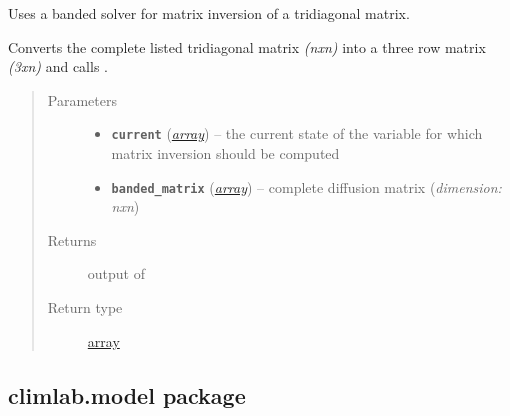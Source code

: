 \documentclass[a4paper,10pt,english]{sphinxmanual}
\begin{document}

\begin{fulllineitems}
\label{api/climlab.dynamics:climlab.dynamics.diffusion._solve_implicit_banded}
Uses a banded solver for matrix inversion of a tridiagonal matrix.

Converts the complete listed tridiagonal matrix \emph{(nxn)} into a three row 
matrix \emph{(3xn)} and calls \href{http://docs.scipy.org/doc/scipy/reference/generated/scipy.linalg.solve\_banded.html\#scipy.linalg.solve\_banded}{}.
\begin{quote}\begin{description}
\item[{Parameters}] \leavevmode\begin{itemize}
\item {} 
\textbf{\texttt{current}} (\href{http://docs.python.org/2.7/library/array.html\#module-array}{\emph{array}}) -- the current state of the variable for which
matrix inversion should be computed

\item {} 
\textbf{\texttt{banded\_matrix}} (\href{http://docs.python.org/2.7/library/array.html\#module-array}{\emph{array}}) -- complete diffusion matrix (\emph{dimension: nxn})

\end{itemize}

\item[{Returns}] \leavevmode
output of \href{http://docs.scipy.org/doc/scipy/reference/generated/scipy.linalg.solve\_banded.html\#scipy.linalg.solve\_banded}{}

\item[{Return type}] \leavevmode
\href{http://docs.python.org/2.7/library/array.html\#module-array}{array}

\end{description}\end{quote}

\end{fulllineitems}



\subsection{climlab.model package}
\label{api/climlab.model:climlab-model-package}\label{api/climlab.model::doc}
\end{document}
